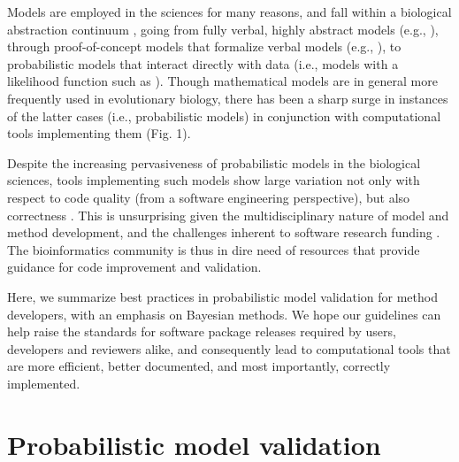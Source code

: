 \documentclass[oneside]{article}
\begin{document}
Models are employed in the sciences for many reasons, and fall within
a biological abstraction continuum \citep{servedio14}, going from
fully verbal, highly abstract models (e.g., \citealt{vanvalen73}), through proof-of-concept models
that formalize verbal models (e.g., \citealt{maynard78,reinhold99,mendes18}), to probabilistic models that interact
directly with data (i.e., models with a likelihood function such as \citealt{yule24,felsenstein73,hky,hudson90}).
Though mathematical models are in general more frequently used in
evolutionary biology, there has been a sharp surge in instances of the
latter cases (i.e., probabilistic models) in conjunction with computational tools implementing them
(Fig. 1).

Despite the increasing pervasiveness of probabilistic models in the
biological sciences, tools implementing such models show large
variation not only with respect to code quality (from a software engineering
perspective), but also correctness \citep{darriba18}.
This is unsurprising given the multidisciplinary nature of model and method
development, and the challenges inherent to software research funding
\citep{siepel19}.
The bioinformatics community is thus in dire need of resources that
provide guidance for code improvement and validation.

Here, we summarize best practices in probabilistic  model validation for method
developers, with an emphasis on Bayesian methods.
We hope our guidelines can help raise the standards for software
package releases required by users, developers and reviewers alike,
and consequently lead to computational tools that are more efficient, better documented, and most
importantly, correctly implemented.



\section*{Probabilistic model validation}
\end{document}
